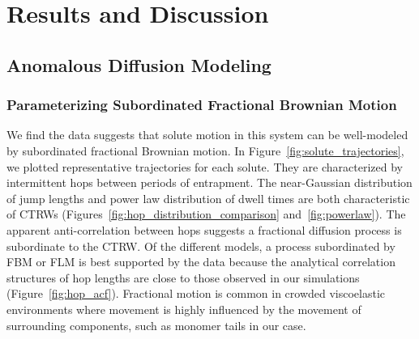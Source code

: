 \documentclass[aps,pre,preprint,groupedaddress,longbibliography]{revtex4-2}
\begin{document}
  \section{Results and Discussion}
  
  \subsection{Anomalous Diffusion Modeling}\label{section:sFBM}
  
  \subsubsection{Parameterizing Subordinated Fractional Brownian Motion}\label{section:AD_parameterization}

  We find the data suggests that solute motion in this system can be well-modeled by 
  subordinated fractional Brownian motion. In Figure~\ref{fig:solute_trajectories},
  we plotted representative trajectories for each solute. They are characterized 
  by intermittent hops between periods of entrapment. The near-Gaussian distribution
  of jump lengths and power law distribution of dwell times are both characteristic
  of CTRWs (Figures~\ref{fig:hop_distribution_comparison} and~\ref{fig:powerlaw}). 
  The apparent anti-correlation between hops suggests a fractional diffusion process
  is subordinate to the CTRW. Of the different models, a process subordinated by FBM
  or FLM is best supported by the data because the analytical correlation structures
  of hop lengths are close to those observed in our simulations (Figure~\ref{fig:hop_acf}).
  Fractional motion is common in crowded viscoelastic environments where movement is
  highly influenced by the movement of surrounding components, such as monomer tails 
  in our case.~\cite{ernst_fractional_2012}
  
\end{document}

